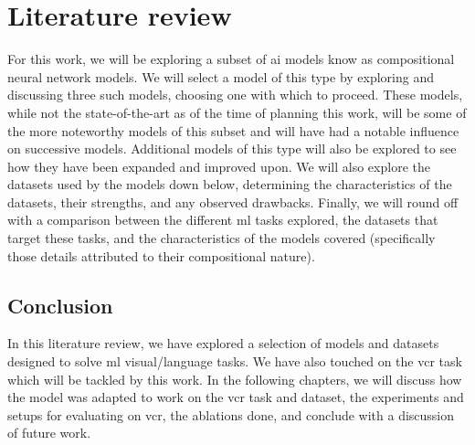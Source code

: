 \chapter{Literature review}
\label{chp:literature_review}

For this work, we will be exploring a subset of \gls{ai} models know as compositional neural network models.
We will select a model of this type by exploring and discussing three such models, choosing one with which to proceed.
These models, while not the state-of-the-art as of the time of planning this work, will be some of the more noteworthy models of this subset and will have had a notable influence on successive models.
Additional models of this type will also be explored to see how they have been expanded and improved upon.
We will also explore the datasets used by the models down below, determining the characteristics of the datasets, their strengths, and any observed drawbacks.
Finally, we will round off with a comparison between the different \gls{ml} tasks explored, the datasets that target these tasks, and the characteristics of the models covered (specifically those details attributed to their compositional nature).


\clearpage


\clearpage


\clearpage


\clearpage

\section{Conclusion}
\label{sec:literature_review_conclusion}

In this literature review, we have explored a selection of models and datasets designed to solve \gls{ml} visual/language tasks.
We have also touched on the \gls{vcr} task which will be tackled by this work.
In the following chapters, we will discuss how the model was adapted to work on the \gls{vcr} task and dataset, the experiments and setups for evaluating on \gls{vcr}, the ablations done, and conclude with a discussion of future work.
